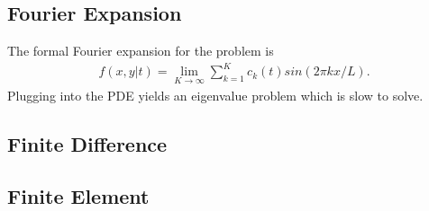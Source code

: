 \documentclass[10pt]{article}
\begin{document}
\subsection{Fourier Expansion}

The formal Fourier expansion for the problem is
\begin{align*}
  f(x,y | t) = \lim_{K\to\infty}\sum_{k=1}^K c_k(t) sin(2\pi k x/L).
\end{align*}
Plugging into the PDE yields an eigenvalue problem which is slow to solve.

\subsection{Finite Difference}

\subsection{Finite Element}



\end{document}
